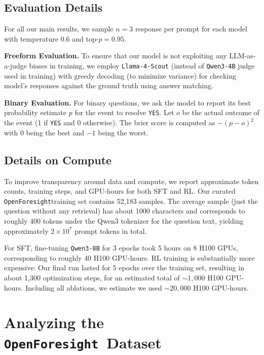 \documentclass{article} %
\newcommand{\ourdataset}{\texttt{OpenForesight}}
\begin{document}
\subsection{Evaluation Details}

For all our main results, we sample $n=3$ response per prompt for each model with temperature $0.6$ and top-$p=0.95$. 

\textbf{Freeform Evaluation.} To ensure that our model is not exploiting any LLM-as-a-judge biases in training, we employ \texttt{Llama-4-Scout} (instead of \texttt{Qwen3-4B} judge used in training) with greedy decoding (to minimize variance) for checking model's responses against the ground truth using answer matching. 


\textbf{Binary Evaluation.} For binary questions, we ask the model to report its best probability estimate $p$ for the event to resolve \texttt{YES}. Let $o$ be the actual outcome of the event (1 if \texttt{YES} and 0 otherwise). The brier score is computed as $-(p - o)^2$ with $0$ being the best and $-1$ being the worst. 

\subsection{Details on Compute}

To improve transparency around data and compute, we report approximate token counts, training steps, and GPU-hours for both SFT and RL. Our curated \ourdataset training set contains 52,183 samples. The average sample (just the question without any retrieval) has about 1000 characters and corresponds to roughly 400 tokens under the Qwen3 tokenizer for the question text, yielding approximately \(2\times 10^{7}\) prompt tokens in total.

For SFT, fine-tuning \texttt{Qwen3-8B} for 3 epochs took 5 hours on 8 \textsc{H100} GPUs, corresponding to roughly 40 \textsc{H100} GPU-hours. RL training is substantially more expensive: Our final run lasted for 5 epochs over the training set, resulting in about 1{,}300 optimization steps, for an estimated total of \(\sim 1{,}000\) \textsc{H100} GPU-hours. Including all ablations, we estimate we used \(\sim 20{,}000\) \textsc{H100} GPU-hours.

\clearpage


\clearpage
\section{Analyzing the \ourdataset \ Dataset}
\label{sec:dataset_details}
\end{document}
